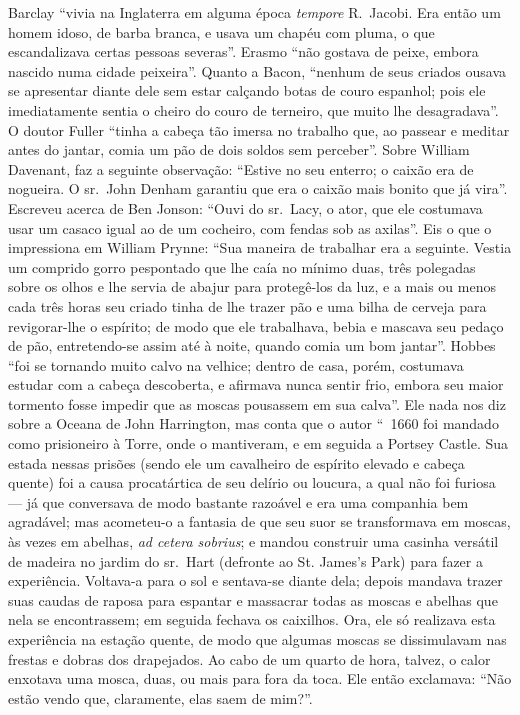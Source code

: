 Barclay “vivia na Inglaterra em alguma época \textit{tempore} R.~Jacobi.
Era então um homem idoso, de barba branca, e usava um chapéu com pluma, o
que escandalizava certas pessoas severas”. Erasmo “não gostava de peixe,
embora nascido numa cidade peixeira”. Quanto a Bacon, “nenhum de seus
criados ousava se apresentar diante dele sem estar calçando botas de couro
espanhol; pois ele imediatamente sentia o cheiro do couro de terneiro, que
muito lhe desagradava”. O doutor Fuller “tinha a cabeça tão imersa no
trabalho que, ao passear e meditar antes do jantar, comia um pão de dois
soldos sem perceber”. Sobre William Davenant, faz a seguinte observação:
“Estive no seu enterro; o caixão era de nogueira. O sr.~John Denham
garantiu que era o caixão mais bonito que já vira”. Escreveu
acerca de Ben Jonson: “Ouvi do sr.~Lacy, o ator, que ele costumava usar
um casaco igual ao de um cocheiro, com fendas sob as axilas”. Eis o que o
impressiona em William Prynne: “Sua maneira de trabalhar era a seguinte.
Vestia um comprido gorro pespontado que lhe caía no mínimo duas, três
polegadas sobre os olhos e lhe servia de abajur para protegê-los da luz, e
a mais ou menos cada três horas seu criado tinha de lhe trazer pão e uma
bilha de cerveja para revigorar-lhe o espírito; de modo que ele
trabalhava, bebia e mascava seu pedaço de pão, entretendo-se assim até à
noite, quando comia um bom jantar”. Hobbes “foi se tornando muito calvo na
velhice; dentro de casa, porém, costumava estudar com a cabeça descoberta,
e afirmava nunca sentir frio, embora seu maior tormento fosse impedir que
as moscas pousassem em sua calva”. Ele nada nos diz sobre a
 Oceana de John Harrington, mas conta que o autor “~1660 
 foi mandado como prisioneiro à Torre, onde o mantiveram,
e em seguida a Portsey Castle. Sua estada nessas prisões (sendo ele um
cavalheiro de espírito elevado e cabeça quente) foi a causa procatártica
de seu delírio ou loucura, a qual não foi furiosa --- já que conversava de
modo bastante razoável e era uma companhia bem agradável; mas acometeu-o a
fantasia de que seu suor se transformava em moscas, às vezes em abelhas,
\textit{ad cetera sobrius}; e mandou construir uma casinha versátil de
madeira no jardim do sr.~Hart (defronte ao St. James’s Park) para fazer a
experiência. Voltava-a para o sol e sentava-se diante dela; depois mandava
trazer suas caudas de raposa para espantar e massacrar todas as moscas e
abelhas que nela se encontrassem; em seguida fechava os caixilhos. Ora,
ele só realizava esta experiência na estação quente, de modo que algumas
moscas se dissimulavam nas frestas e dobras dos drapejados. Ao cabo de um
quarto de hora, talvez, o calor enxotava uma mosca, duas, ou mais para
fora da toca. Ele então exclamava: “Não estão vendo que, claramente, elas
saem de mim?”.

